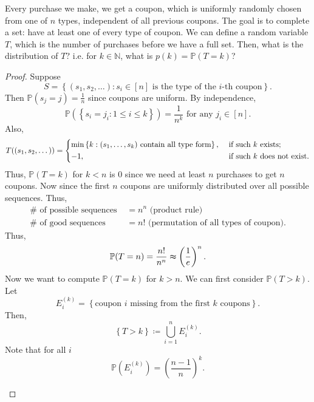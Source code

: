 \begin{eg}
    Every purchase we make, we get a coupon, which is uniformly randomly chosen from one of \(n\) types, independent of all previous coupons. The goal is to complete a set: have at least one of every type of coupon. We can define a random variable \(T\), which is the number of purchases before we have a full set. Then, what is the distribution of \(T\)? i.e. for \(k \in \mathbb{N} \), what is \(p(k) = \mathbb{P} (T = k)\)?    
\end{eg}

\begin{proof}
    Suppose 
    \[
        S = \left\{ (s_1, s_2, \dots) : s_i \in [n] \text{ is the type of the } i\text{-th coupon}  \right\}. 
    \]
    Then \(\mathbb{P} (s_j = j) = \frac{1}{n}\) since coupons are uniform. By independence, 
    \[
        \mathbb{P} (\left\{ s_i = j_i : 1 \le i \le k \right\} ) = \frac{1}{n^k} \text{ for any } j_i \in [n]. 
    \] 
    Also,
    \[
        T((s_1, s_2, \dots )) = \begin{dcases}
            \min \left\{ k: (s_1, \dots , s_k) \text{ contain all type form}  \right\} , &\text{ if such } k \text{ exists};\\
            -1, &\text{ if such } k \text{ does not exist}.
        \end{dcases}
    \]
    Thus, \(\mathbb{P} (T = k)\) for \(k < n\) is \(0\) since we need at least \(n\) purchases to get \(n\) coupons. Now since the first \(n\) coupons are uniformly distributed over all possible sequences. Thus, 
    \begin{align*}
        \# \text{ of possible sequences } &= n^n \text{ (product rule)} \\
        \# \text{ of good sequences } &= n! \text{ (permutation of all types of coupon)}.  
    \end{align*}
    Thus, 
    \[
        \mathbb{P} (T = n) = \frac{n!}{n^n} \thickapprox \left( \frac{1}{e} \right)^n. 
    \] 
    Now we want to compute \(\mathbb{P} (T = k)\) for \(k > n\). We can first consider \(\mathbb{P} (T > k)\). Let 
    \[
        E_i^{(k)} = \left\{ \text{coupon } i \text{ missing from the first } k \text{ coupons}    \right\}. 
    \]  
    Then,
    \[
        \left\{ T > k \right\} \coloneqq \bigcup_{i=1}^{n} E_i^{(k)}.  
    \]
    Note that for all \(i\) 
    \[
        \mathbb{P} \left( E_i^{(k)} \right) = \left( \frac{n-1}{n} \right)^k.  
    \]
    \begin{question}

\end{question}
\end{proof}
